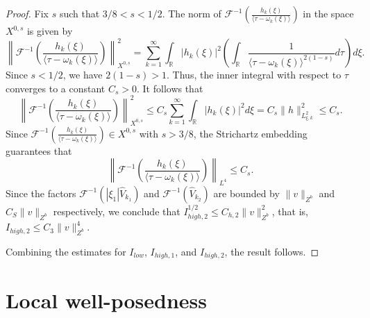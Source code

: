 \documentclass[11pt]{article}
\numberwithin{equation}{section}
\begin{document}
\begin{proof}
Fix $s$ such that $3/8 < s < 1/2$. The norm of $\mathcal{F}^{-1}
\left( \frac{h_{k}(\xi)}{\langle \tau - \omega_{k}(\xi) \rangle}
\right)$ in the space $X^{0,s}$ is given by
\begin{equation}
\left\|\mathcal{F}^{-1} \left( \frac{h_{k}(\xi)}{\langle \tau - \omega_{k}(\xi) \rangle} \right)\right\|_{X^{0,s}}^{2} = \sum_{k=1}^{\infty} \int_{\mathbb{R}} |h_{k}(\xi)|^{2} \left( \int_{\mathbb{R}} \frac{1}{\langle \tau - \omega_{k}(\xi) \rangle^{2(1 -s)}} d\tau \right) d\xi.
\end{equation}
Since $s < 1/2$, we have $2(1 - s) > 1$. Thus, the inner integral with respect to $\tau$ converges to a constant $C_{s} > 0$. It follows that
\begin{equation}
\left\|\mathcal{F}^{-1} \left( \frac{h_{k}(\xi)}{\langle \tau - \omega_{k}(\xi) \rangle} \right)\right\|_{X^{0,s}}^{2} \le C_{s} \sum_{k=1}^{\infty} \int_{\mathbb{R}} |h_{k}(\xi)|^2 d\xi = C_{s} \|h\|_{L^{2}_{\xi, k}}^{2} \le C_{s}.
\end{equation}
Since $\mathcal{F}^{-1} \left( \frac{h_{k}(\xi)}{\langle \tau - \omega_{k}(\xi) \rangle} \right) \in X^{0,s}$ with $s > 3/8$, the Strichartz embedding guarantees that
\begin{equation}\left\|\mathcal{F}^{-1} \left( \frac{h_{k}(\xi)}{\langle \tau - \omega_{k}(\xi) \rangle} \right)\right\|_{L^{4}} \le C_{s}.\end{equation}
Since the factors $\mathcal{F}^{-1}\left(|\xi_{1}| \widehat{V}_{k_{1}}\right)$ and $\mathcal{F}^{-1}\left(\widehat{V}_{k_{2}}\right)$ are bounded by $\|v\|_{Z^{b}}$ and $C_{S}\|v\|_{Z^{b}}$ respectively, we conclude that $I_{high,2}^{1/2} \le C_{h,2}\|v\|_{Z^{b}}^{2}$, that is, $I_{high,2} \le C_{3}\|v\|_{Z^{b}}^{4}$.

Combining the estimates for $I_{low}$, $I_{high,1}$, and $I_{high,2}$, the result follows.
\end{proof}








\section{Local well-posedness}
\end{document}
